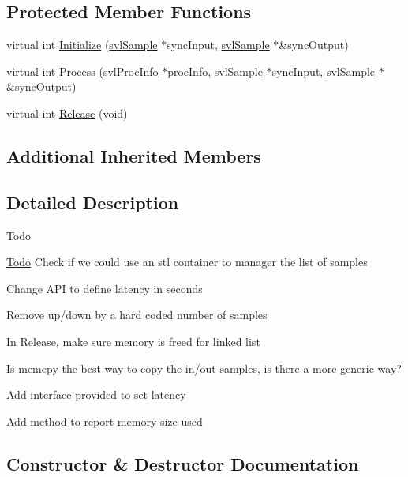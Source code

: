 \subsection*{Protected Member Functions}
\begin{DoxyCompactItemize}
\item 
virtual int \hyperlink{classsvl_filter_add_latency_ad06a3990b76dfac940511599a2878d2c}{Initialize} (\hyperlink{classsvl_sample}{svl\+Sample} $\ast$sync\+Input, \hyperlink{classsvl_sample}{svl\+Sample} $\ast$\&sync\+Output)
\item 
virtual int \hyperlink{classsvl_filter_add_latency_ada70c21a47779f0a2c1342bd487ee17a}{Process} (\hyperlink{structsvl_proc_info}{svl\+Proc\+Info} $\ast$proc\+Info, \hyperlink{classsvl_sample}{svl\+Sample} $\ast$sync\+Input, \hyperlink{classsvl_sample}{svl\+Sample} $\ast$\&sync\+Output)
\item 
virtual int \hyperlink{classsvl_filter_add_latency_af980f5dc40c61ea9c2430fecbe123ef8}{Release} (void)
\end{DoxyCompactItemize}
\subsection*{Additional Inherited Members}


\subsection{Detailed Description}
\begin{DoxyRefDesc}{Todo}
\item[\hyperlink{todo__todo000010}{Todo}]Check if we could use an stl container to manager the list of samples 

Change A\+P\+I to define latency in seconds 

Remove up/down by a hard coded number of samples 

In Release, make sure memory is freed for linked list 

Is memcpy the best way to copy the in/out samples, is there a more generic way? 

Add interface provided to set latency 

Add method to report memory size used \end{DoxyRefDesc}


\subsection{Constructor \& Destructor Documentation}
\hypertarget{classsvl_filter_add_latency_a8a35f064afd54f5e79a83e7325991f47}{}
